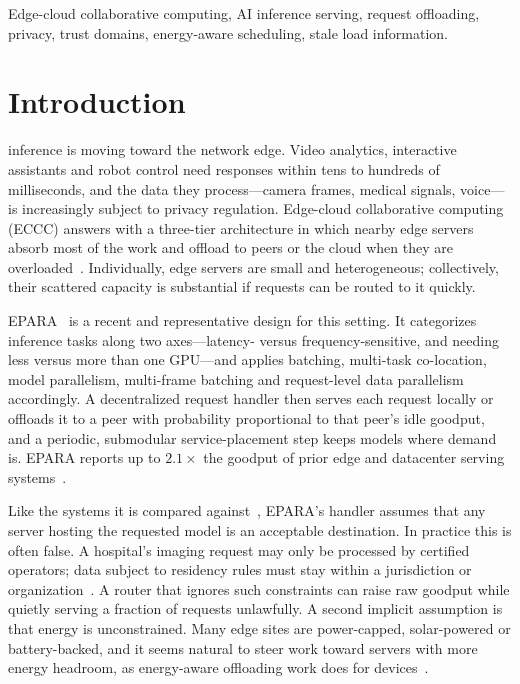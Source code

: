 \documentclass[journal]{IEEEtran}
\begin{document}
\begin{IEEEkeywords}
Edge-cloud collaborative computing, AI inference serving, request offloading, privacy, trust domains, energy-aware scheduling, stale load information.
\end{IEEEkeywords}

\section{Introduction}\label{sec:intro}

 inference is moving toward the network edge. Video analytics, interactive assistants and robot control need responses within tens to hundreds of milliseconds, and the data they process---camera frames, medical signals, voice---is increasingly subject to privacy regulation. Edge-cloud collaborative computing (ECCC) answers with a three-tier architecture in which nearby edge servers absorb most of the work and offload to peers or the cloud when they are overloaded~\cite{liu2025eccc}. Individually, edge servers are small and heterogeneous; collectively, their scattered capacity is substantial if requests can be routed to it quickly.

EPARA~\cite{epara2025} is a recent and representative design for this setting. It categorizes inference tasks along two axes---latency- versus frequency-sensitive, and needing less versus more than one GPU---and applies batching, multi-task co-location, model parallelism, multi-frame batching and request-level data parallelism accordingly. A decentralized request handler then serves each request locally or offloads it to a peer with probability proportional to that peer's idle goodput, and a periodic, submodular service-placement step keeps models where demand is. EPARA reports up to $2.1\times$ the goodput of prior edge and datacenter serving systems~\cite{epara2025}.

Like the systems it is compared against~\cite{interedge,galaxy,servp,alpaserve,usher}, EPARA's handler assumes that any server hosting the requested model is an acceptable destination. In practice this is often false. A hospital's imaging request may only be processed by certified operators; data subject to residency rules must stay within a jurisdiction or organization~\cite{gdpr}. A router that ignores such constraints can raise raw goodput while quietly serving a fraction of requests unlawfully. A second implicit assumption is that energy is unconstrained. Many edge sites are power-capped, solar-powered or battery-backed, and it seems natural to steer work toward servers with more energy headroom, as energy-aware offloading work does for devices~\cite{mao2016harvest,min2019privacy}.
\end{document}
